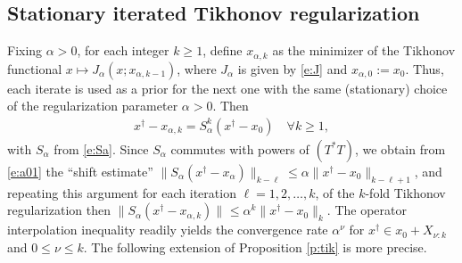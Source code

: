 \documentclass[10pt, a4paper]{iopart}
\newcommand{\norm}[2]{     \| #1       \|_{ #2 }}
\theoremstyle{remark}
\theoremstyle{definition}
\begin{document}


\subsection{Stationary iterated Tikhonov regularization}
\label{s:ip:IT}

Fixing $\alpha > 0$,
for each integer $k \geq 1$,
define $x_{\alpha, k}$ as the minimizer of
the Tikhonov functional
$x \mapsto J_\alpha(x; x_{\alpha,k-1})$,
where $J_\alpha$ is given by \eqref{e:J}
and
$x_{\alpha,0} := x_0$.
%
Thus, each iterate is used as a prior 
for the next one
with the same (stationary) choice of 
the regularization parameter $\alpha > 0$.
%
%
%
Then 
\begin{align}
\label{e:errTk}
	x^\dagger - x_{\alpha,k} = S_\alpha^k (x^\dagger - x_0)
	\quad
	\forall k \geq 1,
\end{align}
with $S_\alpha$ from \eqref{e:Sa}.
%
%
%
%
%
Since $S_\alpha$ commutes with powers of $(T^* T)$,
we obtain from \eqref{e:a01}
the ``shift estimate''
$
	\norm{ S_\alpha (x^\dag - x_\alpha) }{k - \ell} 
	\leq 
	\alpha \norm{x^\dag - x_0}{k - \ell + 1}
$,
and repeating this argument for each iteration $\ell = 1, 2, \ldots, k$,
of the $k$-fold Tikhonov regularization
then
$ %
	\norm{ S_\alpha (x^\dag - x_{\alpha, k}) }{} 
	\leq
	\alpha^k
	\norm{x^\dag - x_0}{k}
	.
$ %
%
%
The operator interpolation inequality 
readily yields
the convergence rate
$\alpha^{\nu}$ 
for $x^\dag \in x_0 + X_{\nu:k}$ and $0 \leq \nu \leq k$.
%
The following extension of 
Proposition \ref{p:tik}
is more precise.
\end{document}
